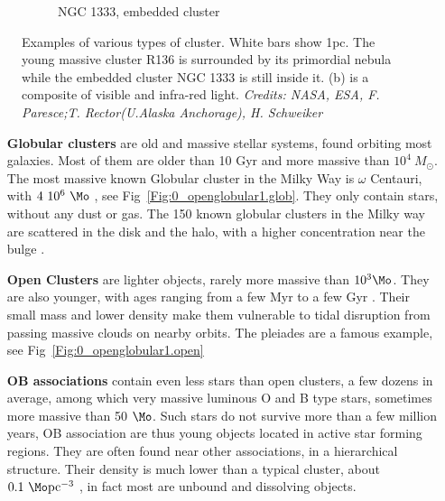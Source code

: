 \begin{figure}
\begin{subfigure}[b]{0.55\textwidth}
        \caption{NGC 1333, embedded cluster}
        \label{Fig:0_openglobular2.emb}
    \end{subfigure}
        \caption{Examples of various types of cluster. White bars show 1pc. The young massive cluster R136 is  surrounded by its primordial nebula while the embedded cluster NGC 1333 is still inside it. (b) is a composite of visible and infra-red light. \textit{Credits: NASA, ESA, F. Paresce;T. Rector(U.Alaska Anchorage), H. Schweiker}}
    \label{Fig:0_ymcemb}
\end{figure}

\begin{itemize}


\item[\textbf{Globular clusters}] are old and massive stellar systems, found orbiting most galaxies. Most of them are older than 10 Gyr and more massive than $10^4~M_\odot$. The most massive known Globular cluster in the Milky Way is $\omega$ Centauri, with $4~10^6~\Mo$ \citep{Dsouza2013}, see Fig~\ref{Fig:0_openglobular1.glob}. They only contain stars, without any dust or gas. The 150 known globular clusters in the Milky way are scattered in the disk and the halo, with a higher concentration near the bulge \citep{Harris1996}. 

\item[\textbf{Open Clusters}] are lighter objects, rarely more massive than $10^3 \Mo$. They are also younger, with ages ranging from a few Myr to a few Gyr \citep{Dias2002}. Their small mass and lower density make them vulnerable to tidal disruption from passing massive clouds on nearby orbits. The pleiades are a famous example, see Fig~\ref{Fig:0_openglobular1.open}

\item[\textbf{OB associations}] contain even less stars than open clusters, a few dozens in average, among which very massive luminous O and B type stars, sometimes more massive than 50 $\Mo$. Such stars do not survive more than a few million years, OB association are thus young objects located in active star forming regions. They are often found near other associations, in a hierarchical structure.  Their density is much lower than a typical cluster, about $0.1 ~\Mo \textrm{pc}^{-3}$ \citep{Wright2014,Garcia2010},  in fact most are unbound and dissolving objects.


\end{itemize}
